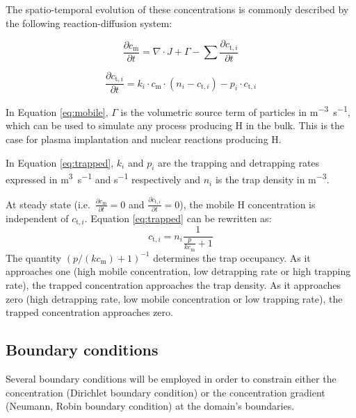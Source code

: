 The spatio-temporal evolution of these concentrations is commonly described by the following reaction-diffusion system:

\begin{equation}
    \frac{\partial c_\mathrm{m}}{\partial t}=\nabla \cdot J+\Gamma-\sum \frac{\partial c_{\mathrm{t}, i}}{\partial t}
    \label{eq:mobile}
\end{equation}

\begin{equation}
    \frac{\partial c_{\mathrm{t}, i}}{\partial t}=k_i \cdot c_\mathrm{m} \cdot\left(n_{i}-c_{\mathrm{t}, i}\right)-p_i \cdot c_{\mathrm{t}, i}
    \label{eq:trapped}
\end{equation}

In Equation \ref{eq:mobile}, $\Gamma$ is the volumetric source term of particles in \si{m^{-3}.s^{-1}}, which can be used to simulate any process producing H in the bulk.
This is the case for plasma implantation and nuclear reactions producing H.

In Equation \ref{eq:trapped}, $k_i$ and $p_i$ are the trapping and detrapping rates expressed in \si{m^3.s^{-1}} and \si{s^{-1}} respectively and $n_i$ is the trap density in \si{m^{-3}}.

At steady state (i.e.\ $\frac{\partial c_\mathrm{m}}{\partial t} = 0$ and $\frac{\partial c_{\mathrm{t}, i}}{\partial t} = 0$), the mobile H concentration is independent of $c_{\mathrm{t}, i}$.
Equation \ref{eq:trapped} can be rewritten as:
\begin{equation}
    c_{\mathrm{t}, i} = n_i \frac{1}{\frac{p}{k c_\mathrm{m}} + 1}
    \label{eq: steady state ct}
\end{equation}
The quantity $(p / (k c_\mathrm{m}) + 1)^{-1}$ determines the trap occupancy. 
As it approaches one (high mobile concentration, low detrapping rate or high trapping rate), the trapped concentration approaches the trap density.
As it approaches zero (high detrapping rate, low mobile concentration or low trapping rate), the trapped concentration approaches zero.

\subsection{Boundary conditions}

Several boundary conditions will be employed in order to constrain either the concentration (Dirichlet boundary condition) or the concentration gradient (Neumann, Robin boundary condition) at the domain's boundaries.

